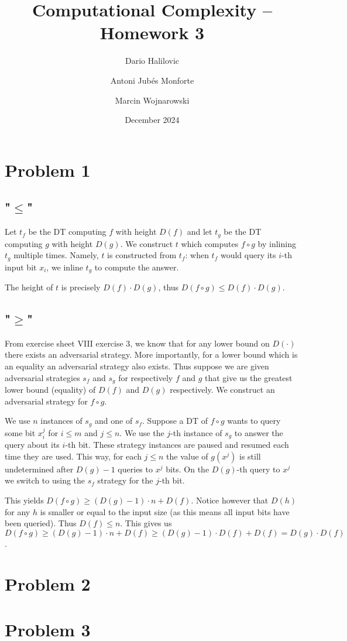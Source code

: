 \documentclass{article}
\title{Computational Complexity -- Homework 3}
\author{Dario Halilovic\and
Antoni Jubés Monforte\and
Marcin Wojnarowski}
\date{December 2024}
\begin{document}
\maketitle

\section*{Problem 1}

\subsection*{"$\le$"}

Let $t_f$ be the DT computing $f$ with height $D(f)$ and let $t_g$ be the DT computing $g$ with height $D(g)$. We construct $t$ which computes $f \circ g$ by inlining $t_g$ multiple times. Namely, $t$ is constructed from $t_f$: when $t_f$ would query its $i$-th input bit $x_i$, we inline $t_g$ to compute the answer.

The height of $t$ is precisely $D(f) \cdot D(g)$, thus $D(f \circ g) \le D(f) \cdot D(g)$.

\subsection*{"$\ge$"}

From exercise sheet VIII exercise 3, we know that for any lower bound on $D(\cdot)$ there exists an adversarial strategy. More importantly, for a lower bound which is an equality an adversarial strategy also exists. Thus suppose we are given adversarial strategies $s_f$ and $s_g$ for respectively $f$ and $g$ that give us the greatest lower bound (equality) of $D(f)$ and $D(g)$ respectively. We construct an adversarial strategy for $f \circ g$.

We use $n$ instances of $s_g$ and one of $s_f$. Suppose a DT of $f \circ g$ wants to query some bit $x_i^j$ for $i \le m$ and $j \le n$. We use the $j$-th instance of $s_g$ to answer the query about its $i$-th bit. These strategy instances are paused and resumed each time they are used. This way, for each $j \le n$ the value of $g(x^j)$ is still undetermined after $D(g)-1$ queries to $x^j$ bits. On the $D(g)$-th query to $x^j$ we switch to using the $s_f$ strategy for the $j$-th bit.

This yields $D(f \circ g) \ge (D(g) - 1) \cdot n + D(f)$. Notice however that $D(h)$ for any $h$ is smaller or equal to the input size (as this means all input bits have been queried). Thus $D(f) \le n$. This gives us $D(f \circ g) \ge (D(g) - 1) \cdot n + D(f) \ge (D(g) - 1) \cdot D(f) + D(f) = D(g) \cdot D(f)$.

\section*{Problem 2}

\section*{Problem 3}
\end{document}
